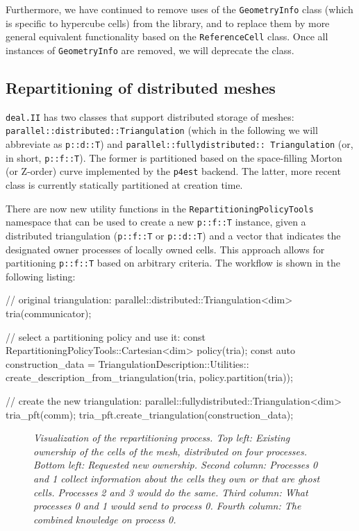 \documentclass{ansarticle-preprint}
\newcommand{\specialword}[1]{\texttt{#1}}
\newcommand{\dealii}{{\specialword{deal.II}}\xspace}
\begin{document}
Furthermore, we have continued to remove uses of the
\texttt{GeometryInfo} class (which is specific to hypercube cells) from
the library, and to replace them by more general equivalent
functionality based on the
\texttt{ReferenceCell} class. Once all instances of
\texttt{GeometryInfo} are removed, we will deprecate the class.

\subsection{Repartitioning of distributed meshes}\label{sec:repartitioning}

\dealii{} has two classes that support distributed storage of meshes: 
\texttt{parallel::\allowbreak distributed::\allowbreak Triangulation}
(which in the following we will abbreviate as \texttt{p::d::T}) and
\texttt{parallel::\allowbreak fullydistributed::\allowbreak
  Triangulation} (or, in short, \texttt{p::f::T}). The former is
partitioned based on the space-filling Morton (or Z-order) curve
implemented by the \texttt{p4est} backend. The latter, more recent
class is currently statically partitioned at creation time.

There are now new utility functions in the
\texttt{RepartitioningPolicyTools} namespace that can be
used to create a new \texttt{p::f::T} instance,
given a distributed triangulation (\texttt{p::f::T} or
\texttt{p::d::T}) and a vector that indicates the designated owner processes of locally
owned cells. This approach allows for partitioning \texttt{p::f::T}
based on arbitrary criteria. The workflow is shown in the following listing:
\begin{c++}
// original triangulation:
parallel::distributed::Triangulation<dim> tria(communicator);

// select a partitioning policy and use it:
const RepartitioningPolicyTools::Cartesian<dim> policy(tria);
const auto construction_data = TriangulationDescription::Utilities::
  create_description_from_triangulation(tria, policy.partition(tria));

// create the new triangulation:
parallel::fullydistributed::Triangulation<dim> tria_pft(comm);
tria_pft.create_triangulation(construction_data);
\end{c++}

\begin{figure}
    \centering
    \def\svgwidth{0.8\columnwidth}
    
    \caption{\it Visualization of the repartitioning process. Top
      left: Existing ownership of the cells of the mesh, distributed
      on four processes. Bottom left:
      Requested new ownership. Second column: Processes 0 and 1
      collect information about the cells they own or that are ghost
      cells. Processes 2 and 3 would do the same. Third column: What
      processes 0 and 1 would send to process 0. Fourth column: The
      combined knowledge on process 0.}\label{fig:repartitioning}
\end{figure}
\end{document}
